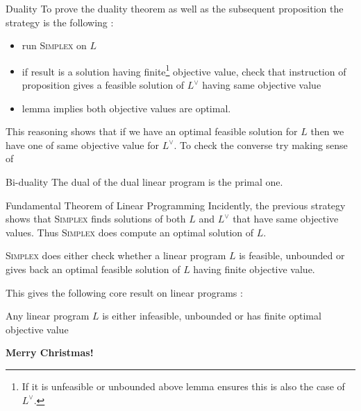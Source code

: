 \documentclass[32pt, aspectratio = 169]{beamer}
\begin{document}
\begin{frame}{Duality}
    To prove the duality theorem as well as the subsequent proposition the strategy is the following :
    \begin{itemize}
        \item run \textsc{Simplex} on $L$
        \item if result is a solution having finite\footnote{If it is unfeasible or unbounded above lemma ensures this is also the case of $L^\vee$.} objective value, check that instruction of proposition gives a feasible solution of $L^\vee$ having same objective value
        \item lemma implies both objective values are optimal.
    \end{itemize}
    This reasoning shows that if we have an optimal feasible solution for $L$ then we have one of same objective value for $L^\vee$. To check the converse try making sense of
    \begin{halfshyblock}{Bi-duality}
        The dual of the dual linear program is the primal one.
    \end{halfshyblock}
\end{frame}

\begin{frame}{Fundamental Theorem of Linear Programming}
    Incidently, the previous strategy shows that \textsc{Simplex} finds solutions of both $L$ and $L^\vee$ that have same objective values. Thus \textsc{Simplex} does compute an optimal solution of $L$.
    \begin{thm}
        \textsc{Simplex} does either check whether a linear program $L$ is feasible, unbounded or gives back an optimal feasible solution of $L$ having finite objective value.
    \end{thm}
    This gives the following core result on linear programs :
    \begin{cor}
        Any linear program $L$ is either infeasible, unbounded or has finite optimal objective value
    \end{cor}
\end{frame}


\begin{frame}
        \centering
        {\huge \textbf{Merry Christmas!}}
\end{frame}
\end{document}
